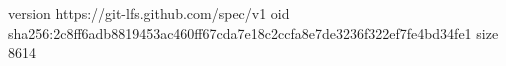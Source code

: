 version https://git-lfs.github.com/spec/v1
oid sha256:2c8ff6adb8819453ac460ff67cda7e18c2ccfa8e7de3236f322ef7fe4bd34fe1
size 8614
